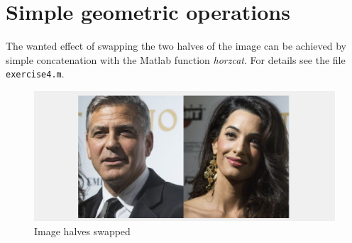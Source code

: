 \section{Simple geometric operations}

The wanted effect of swapping the two halves of the image can be achieved by simple concatenation with the Matlab function \textit{horzcat}. For details see the file \texttt{exercise4.m}.

\begin{figure}[!hbt]
  \includegraphics[width=\textwidth]{./img/task18.png}
  \caption{Image halves swapped}
  \label{fig:task18}
\end{figure}